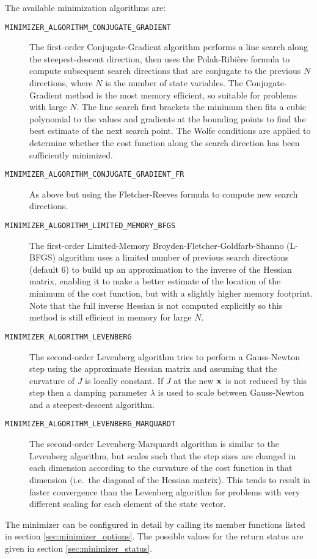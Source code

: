 \documentclass[a4,oneside]{book}
\def\codesize{\small}
\def\citem#1{\item[{\codesize\texttt{#1}}]}
\begin{document}
The available minimization algorithms are:
\begin{description}
\citem{MINIMIZER\_ALGORITHM\_CONJUGATE\_GRADIENT} The first-order
Conjugate-Gradient algorithm performs a line search along the
steepest-descent direction, then uses the Polak-Ribi\`ere formula to
compute subsequent search directions that are conjugate to the
previous $N$ directions, where $N$ is the number of state
variables. The Conjugate-Gradient method is the most memory efficient,
so suitable for problems with large $N$. The line search first
brackets the minimum then fits a cubic polynomial to the values and
gradients at the bounding points to find the best estimate of the next
search point. The Wolfe conditions are applied to determine whether
the cost function along the search direction has been sufficiently
minimized.
%
\citem{MINIMIZER\_ALGORITHM\_CONJUGATE\_GRADIENT\_FR} As above but
using the Fletcher-Reeves formula to compute new search directions.
%
\citem{MINIMIZER\_ALGORITHM\_LIMITED\_MEMORY\_BFGS} The first-order
Limited-Memory Broyden-Fletcher-Goldfarb-Shanno (L-BFGS) algorithm
uses a limited number of previous search directions (default 6) to
build up an approximation to the inverse of the Hessian matrix,
enabling it to make a better estimate of the location of the minimum
of the cost function, but with a slightly higher memory
footprint. Note that the full inverse Hessian is not computed
explicitly so this method is still efficient in memory for large $N$.
%
\citem{MINIMIZER\_ALGORITHM\_LEVENBERG} The second-order Levenberg
algorithm tries to perform a Gauss-Newton step using the approximate
Hessian matrix and assuming that the curvature of $J$ is locally
constant. If $J$ at the new ${\bf x}$ is not reduced by this step then
a damping parameter $\lambda$ is used to scale between Gauss-Newton
and a steepest-descent algorithm.
%
\citem{MINIMIZER\_ALGORITHM\_LEVENBERG\_MARQUARDT} The second-order
Levenberg-Marquardt algorithm is similar to the Levenberg algorithm,
but scales such that the step sizes are changed in each dimension
according to the curvature of the cost function in that dimension
(i.e.\ the diagonal of the Hessian matrix). This tends to result in
faster convergence than the Levenberg algorithm for problems with very
different scaling for each element of the state vector.
\end{description}
The minimizer can be configured in detail by calling its member
functions listed in section \ref{sec:minimizer_options}.  The possible
values for the return status are given in section
\ref{sec:minimizer_status}.
\end{document}
